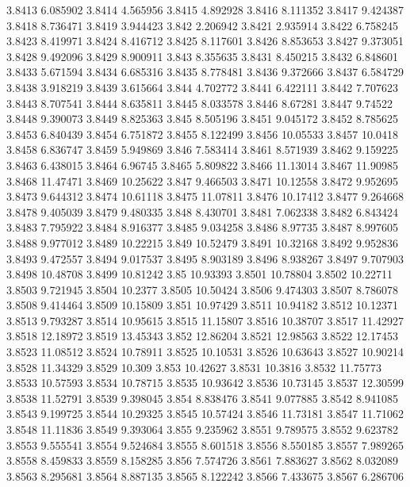 3.8413  6.085902
3.8414  4.565956
3.8415  4.892928
3.8416  8.111352
3.8417  9.424387
3.8418  8.736471
3.8419  3.944423
3.842  2.206942
3.8421  2.935914
3.8422  6.758245
3.8423  8.419971
3.8424  8.416712
3.8425  8.117601
3.8426  8.853653
3.8427  9.373051
3.8428  9.492096
3.8429  8.900911
3.843  8.355635
3.8431  8.450215
3.8432  6.848601
3.8433  5.671594
3.8434  6.685316
3.8435  8.778481
3.8436  9.372666
3.8437  6.584729
3.8438  3.918219
3.8439  3.615664
3.844  4.702772
3.8441  6.422111
3.8442  7.707623
3.8443  8.707541
3.8444  8.635811
3.8445  8.033578
3.8446  8.67281
3.8447  9.74522
3.8448  9.390073
3.8449  8.825363
3.845  8.505196
3.8451  9.045172
3.8452  8.785625
3.8453  6.840439
3.8454  6.751872
3.8455  8.122499
3.8456  10.05533
3.8457  10.0418
3.8458  6.836747
3.8459  5.949869
3.846  7.583414
3.8461  8.571939
3.8462  9.159225
3.8463  6.438015
3.8464  6.96745
3.8465  5.809822
3.8466  11.13014
3.8467  11.90985
3.8468  11.47471
3.8469  10.25622
3.847  9.466503
3.8471  10.12558
3.8472  9.952695
3.8473  9.644312
3.8474  10.61118
3.8475  11.07811
3.8476  10.17412
3.8477  9.264668
3.8478  9.405039
3.8479  9.480335
3.848  8.430701
3.8481  7.062338
3.8482  6.843424
3.8483  7.795922
3.8484  8.916377
3.8485  9.034258
3.8486  8.97735
3.8487  8.997605
3.8488  9.977012
3.8489  10.22215
3.849  10.52479
3.8491  10.32168
3.8492  9.952836
3.8493  9.472557
3.8494  9.017537
3.8495  8.903189
3.8496  8.938267
3.8497  9.707903
3.8498  10.48708
3.8499  10.81242
3.85  10.93393
3.8501  10.78804
3.8502  10.22711
3.8503  9.721945
3.8504  10.2377
3.8505  10.50424
3.8506  9.474303
3.8507  8.786078
3.8508  9.414464
3.8509  10.15809
3.851  10.97429
3.8511  10.94182
3.8512  10.12371
3.8513  9.793287
3.8514  10.95615
3.8515  11.15807
3.8516  10.38707
3.8517  11.42927
3.8518  12.18972
3.8519  13.45343
3.852  12.86204
3.8521  12.98563
3.8522  12.17453
3.8523  11.08512
3.8524  10.78911
3.8525  10.10531
3.8526  10.63643
3.8527  10.90214
3.8528  11.34329
3.8529  10.309
3.853  10.42627
3.8531  10.3816
3.8532  11.75773
3.8533  10.57593
3.8534  10.78715
3.8535  10.93642
3.8536  10.73145
3.8537  12.30599
3.8538  11.52791
3.8539  9.398045
3.854  8.838476
3.8541  9.077885
3.8542  8.941085
3.8543  9.199725
3.8544  10.29325
3.8545  10.57424
3.8546  11.73181
3.8547  11.71062
3.8548  11.11836
3.8549  9.393064
3.855  9.235962
3.8551  9.789575
3.8552  9.623782
3.8553  9.555541
3.8554  9.524684
3.8555  8.601518
3.8556  8.550185
3.8557  7.989265
3.8558  8.459833
3.8559  8.158285
3.856  7.574726
3.8561  7.883627
3.8562  8.032089
3.8563  8.295681
3.8564  8.887135
3.8565  8.122242
3.8566  7.433675
3.8567  6.286706
